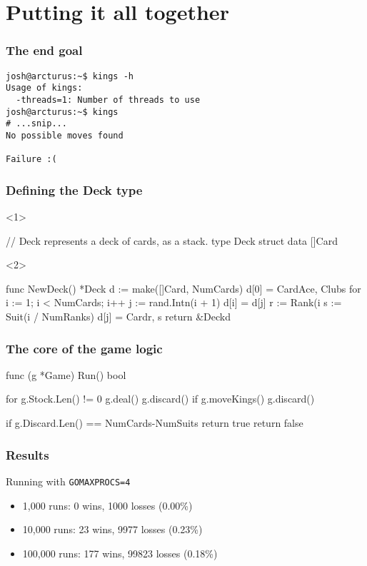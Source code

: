 \documentclass{beamer}
\begin{document}
\section{Putting it all together}

\begin{frame}[fragile]
\frametitle{The end goal}
\begin{verbatim}
josh@arcturus:~$ kings -h
Usage of kings:
  -threads=1: Number of threads to use
josh@arcturus:~$ kings
# ...snip...
No possible moves found

Failure :(
\end{verbatim}
\end{frame}

\begin{frame}[fragile]
\frametitle{Defining the Deck type}
\begin{onlyenv}<1>
\begin{gocode}
// Deck represents a deck of cards, as a stack.
type Deck struct {
        data []Card
}
\end{gocode}
\end{onlyenv}
\begin{onlyenv}<2>
\begin{gocode}
func NewDeck() *Deck {
        d := make([]Card, NumCards)
        d[0] = Card{Ace, Clubs}
        for i := 1; i < NumCards; i++ {
                j := rand.Intn(i + 1)
                d[i] = d[j]
                r := Rank(i%
                s := Suit(i / NumRanks)
                d[j] = Card{r, s}
        }
        return &Deck{d}
}

\end{gocode}
\end{onlyenv}
\end{frame}

\begin{frame}[fragile]
\frametitle{The core of the game logic}
\begin{gocode}
func (g *Game) Run() bool {
        for g.Stock.Len() != 0 {
                g.deal()
                g.discard()
                if g.moveKings() {
                        g.discard()
                }
        }

        if g.Discard.Len() == NumCards-NumSuits {
                return true
        }
        return false
}
\end{gocode}
\end{frame}

\begin{frame}
\frametitle{Results}
Running with \texttt{GOMAXPROCS=4}
\begin{itemize}
\item 1,000 runs: 0 wins, 1000 losses (0.00\%)
\item 10,000 runs: 23 wins, 9977 losses (0.23\%)
\item 100,000 runs: 177 wins, 99823 losses (0.18\%)
\end{itemize}
\end{frame}
\end{document}
